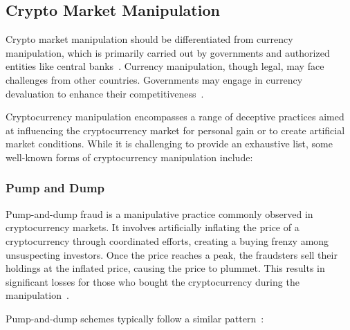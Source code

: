 \subsection{Crypto Market Manipulation}
Crypto market manipulation should be differentiated from currency manipulation, which is primarily carried out by governments
and authorized entities like central banks~\cite{goldstein2018currency}. Currency manipulation, though legal, may face challenges
from other countries. Governments may engage in currency devaluation to enhance their competitiveness~\cite{goldstein2018currency}.

Cryptocurrency manipulation encompasses a range of deceptive practices aimed at influencing the cryptocurrency market for
personal gain or to create artificial market conditions. While it is challenging to provide an exhaustive list, some
well-known forms of cryptocurrency manipulation include:

\subsubsection{Pump and Dump}
Pump-and-dump fraud is a manipulative practice commonly observed in cryptocurrency markets. It involves artificially inflating
the price of a cryptocurrency through coordinated efforts, creating a buying frenzy among unsuspecting investors. Once the
price reaches a peak, the fraudsters sell their holdings at the inflated price, causing the price to plummet. This results
in significant losses for those who bought the cryptocurrency during the manipulation~\cite{karim2018manipulation}.

Pump-and-dump schemes typically follow a similar pattern~\cite{cheah2015pump}:

